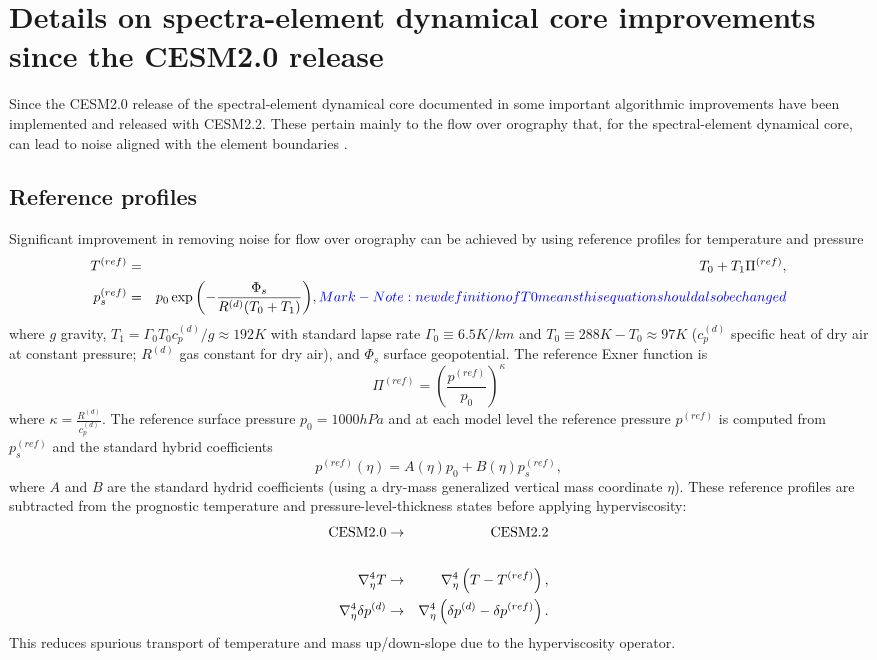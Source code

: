 \documentclass[draft]{agujournal2019}
\begin{document}
\section{Details on spectra-element dynamical core improvements since the CESM2.0 release}
Since the CESM2.0 release of the spectral-element dynamical core documented in  some important algorithmic improvements have been implemented and released with CESM2.2. These pertain mainly to the flow over orography that, for the spectral-element dynamical core, can lead to noise aligned with the element boundaries \cite{HL2018MWR}.
\subsection{Reference profiles}
Significant improvement in removing noise for flow over orography can be achieved by using reference profiles for temperature and pressure
\begin{eqnarray}
  T^{(ref)}&=&T_0+T_1 \Pi^{(ref)},\\
  p_s^{(ref)}&=&p_0\exp{\left(-\frac{\Phi_s}{R^{(d)}(T_0+T_1)}\right)}, {\color{blue}{Mark - Note: new definition of T0 means this equation should also be changed}}
\end{eqnarray}
\cite{SJ1991QJRMS} where $g$ gravity, $T_1=\Gamma_0 T_0 c_p^{(d)}/g\approx 192K$ with standard lapse rate $\Gamma_0\equiv 6.5K/km$ and $T_0\equiv 288K-T_0\approx 97K$ ($c_p^{(d)}$ specific heat of dry air at constant pressure; $R^{(d)}$ gas constant for dry air), and $\Phi_s$ surface geopotential. The reference Exner function is
\begin{equation}
   \Pi^{(ref)}=\left( \frac{p^{(ref)}}{p_0}\right)^{\kappa}
\end{equation}
where $\kappa=\frac{R^{(d)}}{c_p^{(d)}}$. The reference surface pressure $p_0=1000hPa$ and at each model level the reference pressure $p^{(ref)}$ is computed from $p_s^{(ref)}$ and the standard hybrid coefficients
\begin{equation}
    p^{(ref)}(\eta) = A(\eta)p_0+B(\eta)p_s^{(ref)},
\end{equation}
where $A$ and $B$ are the standard hydrid coefficients (using a dry-mass generalized vertical mass coordinate $\eta$). These reference profiles are subtracted from the prognostic temperature and pressure-level-thickness states before applying hyperviscosity:
\begin{eqnarray}
   \hbox{CESM2.0}&\rightarrow&\hbox{CESM2.2}\\
   && \\
  \nabla^4_\eta T &\rightarrow& \nabla^4_\eta \left(T-T^{(ref)}\right),\label{eq:hyperT}\\ 
    \nabla^4_\eta \delta p^{(d)} &\rightarrow& \nabla^4_\eta \left(\delta p^{(d)}-\delta p^{(ref)}\right).\label{eq:hyperDP}
\end{eqnarray}
This reduces spurious transport of temperature and mass up/down-slope due to the hyperviscosity operator. 
\end{document}
